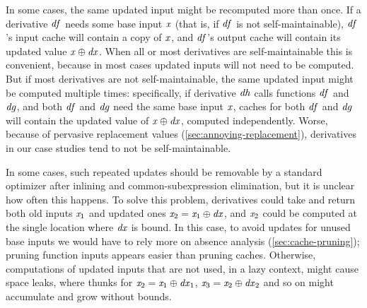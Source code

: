 \begin{poplForThesis}
\label{sec:cts-limit-reupdate}
In some cases, the same updated input might be recomputed more than once.
If a derivative \ensuremath{\Varid{df}} needs some base input \ensuremath{\Varid{x}} (that is, if \ensuremath{\Varid{df}} is not
self-maintainable), \ensuremath{\Varid{df}}'s input cache will contain a copy of \ensuremath{\Varid{x}}, and \ensuremath{\Varid{df}}'s
output cache will contain its updated value \ensuremath{\Varid{x}\oplus \Varid{dx}}. When all or most
derivatives are self-maintainable this is convenient, because in most cases
updated inputs will not need to be computed. But if most derivatives are not self-maintainable, the same updated input might be computed multiple times: specifically,
if derivative \ensuremath{\Varid{dh}} calls functions \ensuremath{\Varid{df}} and \ensuremath{\Varid{dg}}, and both \ensuremath{\Varid{df}} and \ensuremath{\Varid{dg}} need
the same base input \ensuremath{\Varid{x}}, caches for both \ensuremath{\Varid{df}} and \ensuremath{\Varid{dg}} will contain the updated
value of \ensuremath{\Varid{x}\oplus \Varid{dx}}, computed independently. Worse, because of pervasive
replacement values (\cref{sec:annoying-replacement}), derivatives in our case
studies tend to not be self-maintainable.

In some cases, such repeated updates should be removable by a standard optimizer
after inlining and common-subexpression elimination, but it is unclear how often this happens.
To solve this problem, derivatives could take and return both old inputs \ensuremath{\Varid{x}_{1}}
and updated ones \ensuremath{\Varid{x}_{2}\mathrel{=}\Varid{x}_{1}\oplus \Varid{dx}}, and \ensuremath{\Varid{x}_{2}} could be computed at the single
location where \ensuremath{\Varid{dx}} is bound. In this case, to avoid updates for unused base
inputs we would have to rely more on absence analysis
(\cref{sec:cache-pruning}); pruning function inputs appears easier than pruning
caches. Otherwise, computations of updated inputs that are not used, in a lazy
context, might cause space leaks, where thunks for \ensuremath{\Varid{x}_{2}\mathrel{=}\Varid{x}_{1}\oplus \Varid{dx}_{1}}, \ensuremath{\Varid{x}_{3}\mathrel{=}\Varid{x}_{2}\oplus \Varid{dx}_{2}} and so on might accumulate and grow without bounds.
\end{poplForThesis}

